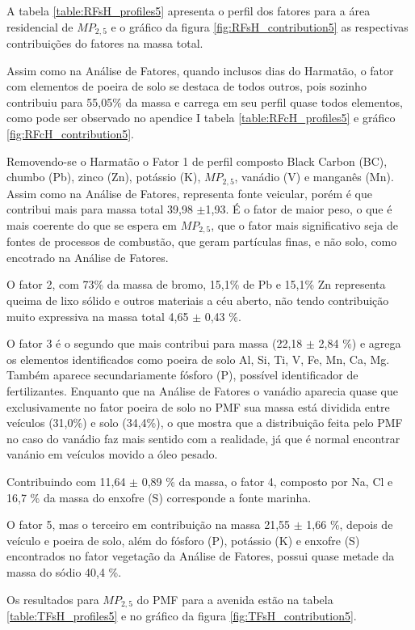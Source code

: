 A tabela \ref{table:RFsH_profiles5} apresenta o perfil dos fatores para a área
residencial de $MP_{2,5}$ e o gráfico da figura \ref{fig:RFsH_contribution5}
as respectivas contribuições do fatores na massa total. 

Assim como na Análise de Fatores, quando inclusos dias do Harmatão, 
o fator com elementos de poeira de solo se destaca de todos outros, 
pois sozinho contribuiu para 55,05\% da massa 
e carrega em seu perfil quase todos elementos, como pode ser observado 
no apendice I tabela \ref{table:RFcH_profiles5} e gráfico 
\ref{fig:RFcH_contribution5}.

Removendo-se o Harmatão o Fator 1 de perfil composto Black Carbon (BC), 
chumbo (Pb), zinco (Zn), potássio (K), $MP_{2,5}$, vanádio (V) e manganês (Mn).
Assim como na Análise de Fatores, representa fonte veicular, porém é que 
contribui mais para massa total 39,98 $\pm$1,93. É o fator de maior peso, 
o que é mais coerente do que se espera em $MP_{2,5}$, que o fator mais 
significativo seja de fontes de processos de combustão, que geram partículas
finas, e não solo, como encotrado na Análise de Fatores.

O fator 2, com 73\% da massa de bromo, 15,1\% de Pb e 15,1\% Zn representa 
queima de lixo sólido e outros materiais a céu aberto, não tendo contribuição
muito expressiva na massa total 4,65 $\pm$ 0,43 \%.

O fator 3 é o segundo que mais contribui para massa (22,18 $\pm$ 2,84 \%) 
e agrega os elementos identificados como poeira de solo Al, Si, Ti, V, Fe, Mn, 
Ca, Mg. Também aparece secundariamente fósforo (P), possível identificador de
fertilizantes. Enquanto que na Análise de Fatores o vanádio aparecia
quase que exclusivamente no fator poeira de solo no PMF sua massa está dividida
entre veículos (31,0\%) e solo (34,4\%), o que mostra que a distribuição
feita pelo PMF no caso do vanádio faz mais sentido com a realidade, já que
é normal encontrar vanánio em veículos movido a óleo pesado.

Contribuindo com 11,64 $\pm$ 0,89 \% da massa, o fator 4, composto por Na, Cl e
16,7 \% da massa do enxofre (S) corresponde a fonte marinha. 

O fator 5, mas o terceiro em contribuição na massa 21,55 $\pm$ 1,66 \%, depois
de veículo e poeira de solo, além do fósforo (P), potássio (K) e enxofre (S) 
encontrados no fator vegetação da Análise de Fatores, possui quase metade da 
massa do sódio 40,4 \%.

Os resultados para $MP_{2,5}$ do PMF para a avenida estão na tabela 
\ref{table:TFsH_profiles5} e no gráfico da figura \ref{fig:TFsH_contribution5}.

